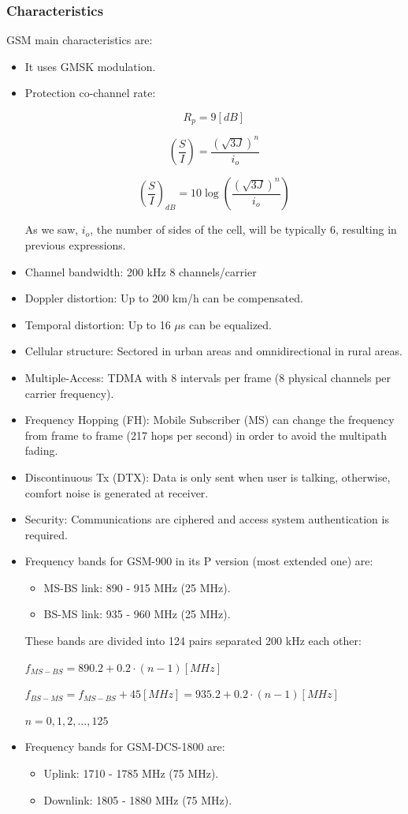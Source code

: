 \documentclass[../main.tex]{subfiles}
\begin{document}
\subsubsection{Characteristics}

GSM main characteristics are:

\begin{itemize}
	\item It uses GMSK modulation.
	\item {
		Protection co-channel rate:

		$$
			R_p = 9 [dB]
		$$

		$$
			\left( \frac{S}{I} \right) = \frac {(\sqrt{3 J})^n} {i_o}
		$$

		$$
			\left( \frac{S}{I} \right)_{dB} = 10 \log \left( \frac {(\sqrt{3 J})^n} {i_o} \right)
		$$

		As we saw, $i_o$, the number of sides of the cell, will be typically 6, resulting in previous expressions.
	}
	\item Channel bandwidth: 200 kHz 8 channels/carrier
	\item Doppler distortion: Up to 200 km/h can be compensated.
	\item Temporal distortion: Up to 16 $\mu$s can be equalized.
	\item Cellular structure: Sectored in urban areas and omnidirectional in rural areas.
	\item Multiple-Access: TDMA with 8 intervals per frame (8 physical channels per carrier frequency).
	\item Frequency Hopping (FH): Mobile Subscriber (MS) can change the frequency from frame to frame (217 hops per second) in order to avoid the multipath fading.
	\item Discontinuous Tx (DTX): Data is only sent when user is talking, otherwise, comfort noise is generated at receiver.
	\item Security: Communications are ciphered and access system authentication is required.
	\item {
		Frequency bands for GSM-900 in its P version (most extended one) are:
		\begin{itemize}
			\item MS-BS link: 890 - 915 MHz (25 MHz).
			\item BS-MS link: 935 - 960 MHz (25 MHz).
		\end{itemize}
		These bands are divided into 124 pairs separated 200 kHz each other:

		$f_{MS-BS} = 890.2 + 0.2 \cdot (n - 1) [MHz]$

		$f_{BS-MS} = f_{MS-BS} + 45 [MHz] = 935.2 + 0.2 \cdot (n - 1) [MHz]$

		$n = 0, 1, 2, \ldots, 125$
	}
	\item {
		Frequency bands for GSM-DCS-1800 are:
		\begin{itemize}
			\item Uplink: 1710 - 1785 MHz (75 MHz).
			\item Downlink: 1805 - 1880 MHz (75 MHz).
		\end{itemize}
	}
\end{itemize}
\end{document}
